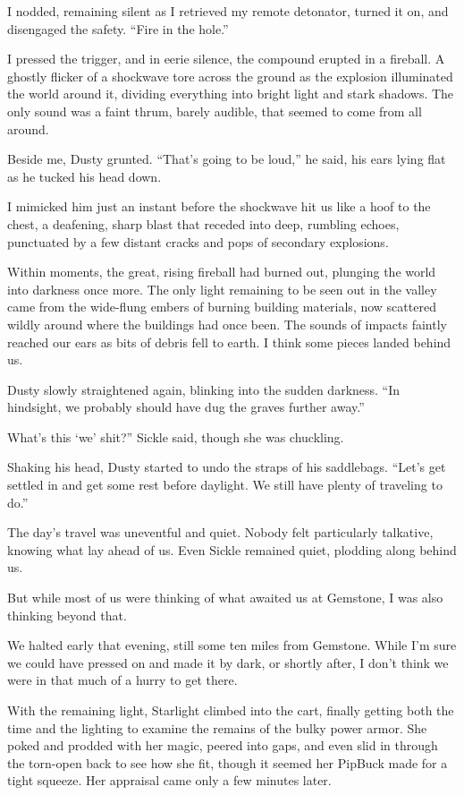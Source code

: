 I nodded, remaining silent as I retrieved my remote detonator, turned it on, and disengaged the safety. “Fire in the hole.”

I pressed the trigger, and in eerie silence, the compound erupted in a fireball. A ghostly flicker of a shockwave tore across the ground as the explosion illuminated the world around it, dividing everything into bright light and stark shadows. The only sound was a faint thrum, barely audible, that seemed to come from all around.

Beside me, Dusty grunted. “That’s going to be loud,” he said, his ears lying flat as he tucked his head down.

I mimicked him just an instant before the shockwave hit us like a hoof to the chest, a deafening, sharp blast that receded into deep, rumbling echoes, punctuated by a few distant cracks and pops of secondary explosions.

Within moments, the great, rising fireball had burned out, plunging the world into darkness once more. The only light remaining to be seen out in the valley came from the wide-flung embers of burning building materials, now scattered wildly around where the buildings had once been. The sounds of impacts faintly reached our ears as bits of debris fell to earth. I think some pieces landed behind us.

Dusty slowly straightened again, blinking into the sudden darkness. “In hindsight, we probably should have dug the graves further away.”

\leavevmode{}What’s this ‘we’ shit?” Sickle said, though she was chuckling.

Shaking his head, Dusty started to undo the straps of his saddlebags. “Let’s get settled in and get some rest before daylight. We still have plenty of traveling to do.”

{\br}%
The day’s travel was uneventful and quiet. Nobody felt particularly talkative, knowing what lay ahead of us. Even Sickle remained quiet, plodding along behind us.

But while most of us were thinking of what awaited us at Gemstone, I was also thinking beyond that.

We halted early that evening, still some ten miles from Gemstone. While I’m sure we could have pressed on and made it by dark, or shortly after, I don’t think we were in that much of a hurry to get there.

With the remaining light, Starlight climbed into the cart, finally getting both the time and the lighting to examine the remains of the bulky power armor. She poked and prodded with her magic, peered into gaps, and even slid in through the torn-open back to see how she fit, though it seemed her PipBuck made for a tight squeeze. Her appraisal came only a few minutes later.

